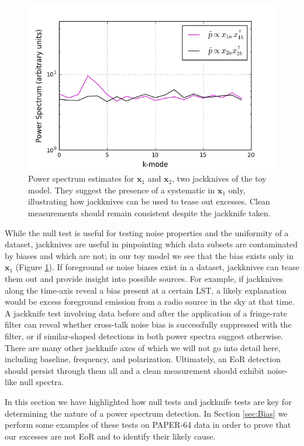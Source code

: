 \documentclass[preprint2,numberedappendix,tighten]{aastex6}  %
\begin{document}
\begin{figure}
	\centering
	\includegraphics[trim={0.3cm 0.3cm 0.3cm 0.3cm},width=\columnwidth]{plots/toy_bias2.png}
	\caption{Power spectrum estimates for $\textbf{x}_{1}$ and $\textbf{x}_{2}$, two jackknives of the toy model. They suggest 
the presence of a systematic in $\textbf{x}_{1}$ only, illustrating how jackknives can be used to tease out excesses. Clean 
measurements should remain consistent despite the jackknife taken.}
	\label{fig:toy_bias2}
\end{figure}

While the null test is useful for testing noise properties and the uniformity of a dataset, jackknives are useful in pinpointing 
which data subsets are contaminated by biases and which are not; in our toy model we see that the bias exists only in $
\textbf{x}_{1}$ (Figure \ref{fig:toy_bias2}). If foreground or noise biases exist in a dataset, jackknives can tease them out and 
provide insight into possible sources. For example, if jackknives along the time-axis reveal a bias present at a certain LST, a 
likely explanation would be excess foreground emission from a radio source in the sky at that time. A jackknife test involving 
data before and after the application of a fringe-rate filter can reveal whether cross-talk noise bias is successfully suppressed 
with the filter, or if similar-shaped detections in both power spectra suggest otherwise. There are many other jackknife axes of 
which we will not go into detail here, including baseline, frequency, and polarization. Ultimately, an EoR detection should persist 
through them all and a clean measurement should exhibit noise-like null spectra.

In this section we have highlighted how null tests and jackknife tests are key for determining the nature of a power spectrum 
detection. In Section \ref{sec:Bias} we perform some examples of these tests on PAPER-64 data in order to prove that our 
excesses are not EoR and to identify their likely cause. 
\end{document}
